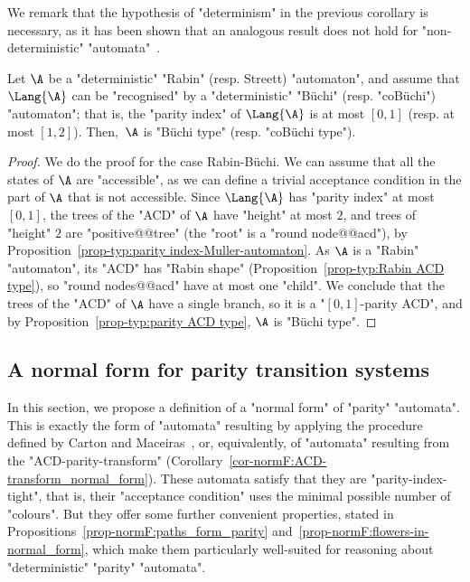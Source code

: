 \documentclass{theoretics}
\begin{document}
We remark that the hypothesis of "determinism" in the previous corollary is necessary, as it has been shown that an analogous result does not hold for "non-deterministic" "automata"~\cite{BKS10Paritizing}.




\begin{proposition}
	Let $\A$ be a "deterministic" "Rabin" (resp. Streett) "automaton", and assume that $\Lang{\A}$ can be "recognised" by a "deterministic" "B\"uchi" (resp. "coB\"uchi") "automaton"; that is, the "parity index" of $\Lang{\A}$ is at most $[0,1]$ (resp. at most $[1,2]$). Then,~$\A$ is "B\"uchi type" (resp. "coB\"uchi type").
\end{proposition}
\begin{proof}
	We do the proof for the case Rabin-B\"uchi. We can assume that all the states of $\A$ are "accessible", as we can define a trivial acceptance condition in the part of $\A$ that is not accessible.  Since $\Lang{\A}$ has "parity index" at most $[0,1]$, the trees of the "ACD" of $\A$ have "height" at most $2$, and trees of "height" $2$ are "positive@@tree" (the "root" is a "round node@@acd"), by Proposition~\ref{prop-typ:parity index-Muller-automaton}. As $\A$ is a "Rabin" "automaton", its "ACD" has "Rabin shape" (Proposition~\ref{prop-typ:Rabin ACD type}), so "round nodes@@acd" have at most one "child". We conclude that the trees of the "ACD" of $\A$ have a single branch, so it is a "$[0,1]$-parity ACD", and by Proposition~\ref{prop-typ:parity ACD type}, $\A$ is "B\"uchi type".
\end{proof}



\subsection{A normal form for parity transition systems}\label{subsec-corollaries: normal-form}
In this section, we propose a definition of a "normal form" of "parity" "automata". This is exactly the form of "automata" resulting by applying the procedure defined by Carton and Maceiras~\cite{CartonMaceiras99RabinIndex}, or, equivalently, of "automata" resulting from the "ACD-parity-transform" (Corollary~\ref{cor-normF:ACD-transform_normal_form}). These automata satisfy that they are "parity-index-tight", that is, their "acceptance condition" uses the minimal possible number of "colours". But they offer some further convenient properties, stated in Propositions~\ref{prop-normF:paths_form_parity} and~\ref{prop-normF:flowers-in-normal_form}, which make them particularly well-suited for reasoning about "deterministic" "parity" "automata".
\end{document}

